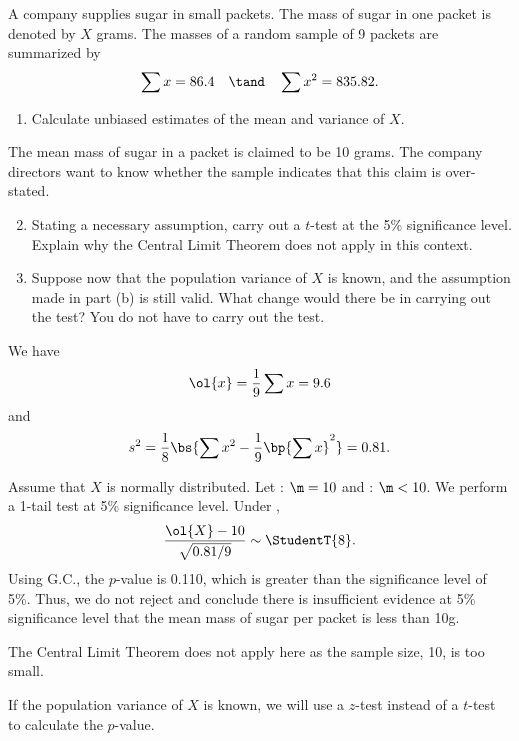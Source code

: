 \begin{problem}
    A company supplies sugar in small packets. The mass of sugar in one packet is denoted by $X$ grams. The masses of a random sample of 9 packets are summarized by \[\sum x = 86.4 \quad \tand \quad \sum x^2 = 835.82.\]
    
    \begin{enumerate}
        \item Calculate unbiased estimates of the mean and variance of $X$.
    \end{enumerate}

    The mean mass of sugar in a packet is claimed to be 10 grams. The company directors want to know whether the sample indicates that this claim is over-stated.

    \begin{enumerate}
        \setcounter{enumi}{1}
        \item Stating a necessary assumption, carry out a $t$-test at the 5\% significance level. Explain why the Central Limit Theorem does not apply in this context.
        \item Suppose now that the population variance of $X$ is known, and the assumption made in part (b) is still valid. What change would there be in carrying out the test? You do not have to carry out the test.
    \end{enumerate}
\end{problem}
\begin{solution}
    \begin{ppart}
        We have \[\ol{x} = \frac19 \sum x = 9.6\] and \[s^2 = \frac18 \bs{\sum x^2 - \frac19 \bp{\sum x}^2} = 0.81.\]
    \end{ppart}
    \begin{ppart}
        Assume that $X$ is normally distributed. Let \nullhyp: $\m = 10$ and \althyp: $\m < 10$. We perform a 1-tail test at 5\% significance level. Under \nullhyp{}, \[\frac{\ol{X} - 10}{\sqrt{0.81/9}} \sim \StudentT{8}.\] Using G.C., the $p$-value is 0.110, which is greater than the significance level of 5\%. Thus, we do not reject \nullhyp{} and conclude there is insufficient evidence at 5\% significance level that the mean mass of sugar per packet is less than 10g.

        The Central Limit Theorem does not apply here as the sample size, 10, is too small.
    \end{ppart}
    \begin{ppart}
        If the population variance of $X$ is known, we will use a $z$-test instead of a $t$-test to calculate the $p$-value.
    \end{ppart}
\end{solution}


